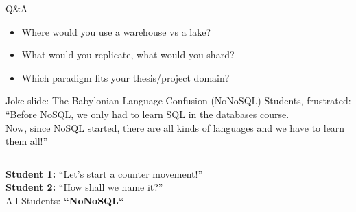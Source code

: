 \documentclass[10pt,aspectratio=169]{beamer}
\newcommand{\stick}[3]{%
  \begin{scope}[shift={(#1,#2)}]
    \draw[line width=0.9pt] (0,0.25) circle (0.18);
    \node[font=\scriptsize] at (0,0.25) {#3};
    \draw[line width=0.9pt] (0,0.07) -- (0,-0.55);
    \draw[line width=0.9pt] (-0.32,-0.15) -- (0.32,-0.15);
    \draw[line width=0.9pt] (0,-0.55) -- (-0.28,-0.95);
    \draw[line width=0.9pt] (0,-0.55) -- (0.28,-0.95);
  \end{scope}
}
\begin{document}
\begin{frame}{Q\&A}
\begin{itemize}
  \item Where would you use a warehouse vs a lake?
  \item What would you replicate, what would you shard?
  \item Which paradigm fits your thesis/project domain?
\end{itemize}
\end{frame}


\begin{frame}{Joke slide: The Babylonian Language Confusion (NoNoSQL)}
\small
Students, frustrated: \\
``Before NoSQL, we only had to learn SQL in the databases course.\\
Now, since NoSQL started, there are all kinds of languages and we have to learn them all!''

\vspace{0.6em}
\begin{columns}[T,onlytextwidth]
\textbf{Student 1:} ``Let's start a counter movement!''\\[0.2em]
\textbf{Student 2:} ``How shall we name it?''\\[0.2em]
All Students: \textbf{``NoNoSQL``}

\vspace{0.6em}


\centering
{}
\end{columns}
\end{frame}
\end{document}
